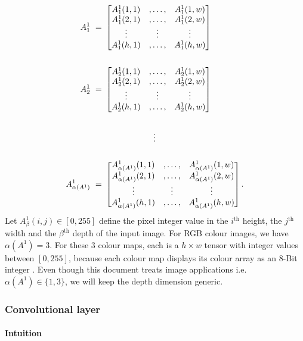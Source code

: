 \documentclass{article}
\begin{document}
\begin{align} 
A_1^1 \ = \
&\begin{bmatrix} \label{input_matrix1}
A_1^1(1,1)&, \ldots , &A_1^1(1,w) \\
A_1^1(2,1)&, \ldots,   &A_1^1(2,w)\\
\vdots&  \vdots  &\vdots \\
A_1^1(h,1)&, \ldots,  &A_1^1(h,w)
\end{bmatrix}
\\ \notag \\
A_2^1 \ = \
&\begin{bmatrix} \label{input_matrix2}
 A_2^1(1,1)&, \ldots , &A_2^1(1,w) \\
A_2^1(2,1)&, \ldots,   &A_2^1(2,w)\\
\vdots&  \vdots  &\vdots \\
A_2^1(h,1)&, \ldots,  &A_2^1(h,w)
\end{bmatrix}
\\  \notag \\
&\qquad \qquad \quad \ \notag \ \, \vdots \\ \notag \\
A_{\alpha(A^1)}^1 \ = \
&\begin{bmatrix} \label{input_matrix3}
A_{\alpha(A^1)}^1(1,1)&, \ldots , &A_{\alpha(A^1)}^1(1,w) \\
A_{\alpha(A^1)}^1(2,1)&, \ldots,   &A_{\alpha(A^1)}^1(2,w)\\
\vdots&  \vdots  &\vdots \\
A_{\alpha(A^1)}^1(h,1)&, \ldots,  &A_{\alpha(A^1)}^1(h,w)
\end{bmatrix}.
\end{align}
Let $A_\beta^1(i,j) \in [0, 255]$ define the pixel integer value in the $i^\text{th}$ height, the $j^\text{th}$ width and the $\beta^\text{th}$ depth of the input image. For RGB colour images, we have $\alpha(A^1) = 3$. For these $3$ colour maps, each is a $ h \times w$ tensor with integer values between $[0,255]$, because each colour map displays its colour array as an $8$-Bit integer \cite{Goodfellow-et-al-2016}. Even though this document treats image applications i.e. $\alpha(A^1) \in \{1, 3 \}$, we will keep the depth dimension generic.

\subsubsection{Convolutional layer} \label{subsection:convolutional_layer}

\paragraph{Intuition}
\end{document}
